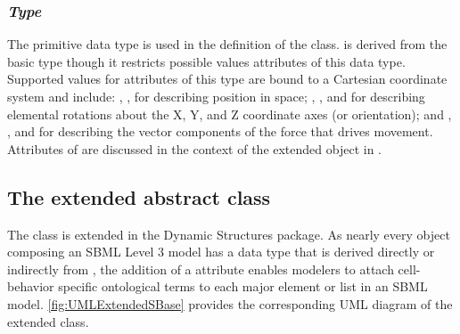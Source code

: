 %
%

\subsubsection{\emph{Type} }
\label{dat:SpatialKind}

The  primitive data type is used in the definition of the \SpatialComponent class.  is derived from the basic  type  though it restricts possible values attributes of this data type. Supported values for attributes of this type are bound to a Cartesian coordinate system and include: , ,  for describing position in space; , , and  for describing elemental rotations about the X, Y, and Z coordinate axes (or orientation); and , , and  for describing the vector components of the force that drives movement. Attributes of  are discussed in the context of the extended \Compartment object in .

\subsection{The extended  abstract class}
\label{subsec:extSBase}

The \SBase class is extended in the Dynamic Structures package. As nearly every object composing an SBML Level 3 model has a data type that is derived directly or indirectly from \SBase, the addition of a  attribute enables modelers to attach cell-behavior specific ontological terms to each major element or list in an SBML model. \ref{fig:UMLExtendedSBase} provides the corresponding UML diagram of the extended \SBase class. 

